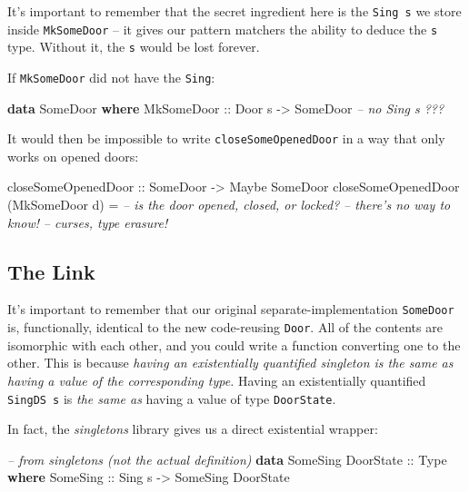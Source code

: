 \documentclass[]{article}
\newenvironment{Shaded}{}{}
\newcommand{\KeywordTok}[1]{\textcolor[rgb]{0.00,0.44,0.13}{\textbf{#1}}}
\newcommand{\DataTypeTok}[1]{\textcolor[rgb]{0.56,0.13,0.00}{#1}}
\newcommand{\CommentTok}[1]{\textcolor[rgb]{0.38,0.63,0.69}{\textit{#1}}}
\newcommand{\OtherTok}[1]{\textcolor[rgb]{0.00,0.44,0.13}{#1}}
\newcommand{\FunctionTok}[1]{\textcolor[rgb]{0.02,0.16,0.49}{#1}}
\newcommand{\NormalTok}[1]{#1}
\begin{document}
It's important to remember that the secret ingredient here is the
\texttt{Sing\ s} we store inside \texttt{MkSomeDoor} -- it gives our pattern
matchers the ability to deduce the \texttt{s} type. Without it, the \texttt{s}
would be lost forever.

If \texttt{MkSomeDoor} did not have the \texttt{Sing}:

\begin{Shaded}
\begin{Highlighting}[]
\KeywordTok{data} \DataTypeTok{SomeDoor} \KeywordTok{where}
    \DataTypeTok{MkSomeDoor}\OtherTok{  ::} \DataTypeTok{Door}\NormalTok{ s }\OtherTok{->} \DataTypeTok{SomeDoor}       \CommentTok{-- no Sing s ???}
\end{Highlighting}
\end{Shaded}

It would then be impossible to write \texttt{closeSomeOpenedDoor} in a way that
only works on opened doors:

\begin{Shaded}
\begin{Highlighting}[]
\OtherTok{closeSomeOpenedDoor ::} \DataTypeTok{SomeDoor} \OtherTok{->} \DataTypeTok{Maybe} \DataTypeTok{SomeDoor}
\NormalTok{closeSomeOpenedDoor (}\DataTypeTok{MkSomeDoor}\NormalTok{ d) }\FunctionTok{=}
            \CommentTok{-- is the door opened, closed, or locked?}
            \CommentTok{-- there's no way to know!}
            \CommentTok{-- curses, type erasure!}
\end{Highlighting}
\end{Shaded}

\subsection{The Link}\label{the-link}

It's important to remember that our original separate-implementation
\texttt{SomeDoor} is, functionally, identical to the new code-reusing
\texttt{Door}. All of the contents are isomorphic with each other, and you could
write a function converting one to the other. This is because \emph{having an
existentially quantified singleton is the same as having a value of the
corresponding type.} Having an existentially quantified \texttt{SingDS\ s} is
\emph{the same as} having a value of type \texttt{DoorState}.

In fact, the \emph{singletons} library gives us a direct existential wrapper:

\begin{Shaded}
\begin{Highlighting}[]
\CommentTok{-- from singletons (not the actual definition)}
\KeywordTok{data} \DataTypeTok{SomeSing} \DataTypeTok{DoorState}\OtherTok{ ::} \DataTypeTok{Type} \KeywordTok{where}
    \DataTypeTok{SomeSing}\OtherTok{ ::} \DataTypeTok{Sing}\NormalTok{ s }\OtherTok{->} \DataTypeTok{SomeSing} \DataTypeTok{DoorState}
\end{Highlighting}
\end{Shaded}
\end{document}
